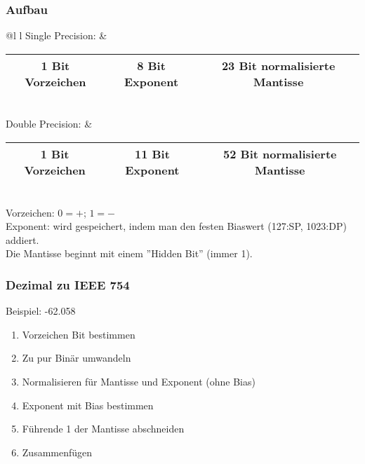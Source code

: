 \documentclass[12pt]{article}
\begin{document}
\subsubsection{Aufbau}
\begin{tabular}{@{}l l}
    Single Precision: &
    \begin{tabular}{|c|c|c|}
        \hline
        1 Bit Vorzeichen & 8 Bit Exponent & 23 Bit normalisierte Mantisse\\
        \hline
    \end{tabular} \\
    Double Precision: &
    \begin{tabular}{|c|c|c|}
        \hline
        1 Bit Vorzeichen & 11 Bit Exponent & 52 Bit normalisierte Mantisse\\
        \hline
    \end{tabular}
\end{tabular} \\
\newline
Vorzeichen: $0 = +$; $1 = -$ \\
\newline
Exponent: wird gespeichert, indem man den festen Biaswert (127:SP, 1023:DP) addiert. \\
\newline
Die Mantisse beginnt mit einem ''Hidden Bit'' (immer 1).
\subsubsection{Dezimal zu IEEE 754}
Beispiel: -62.058
\begin{enumerate}
    \item Vorzeichen Bit bestimmen
    \item Zu pur Binär umwandeln
    \item Normalisieren für Mantisse und Exponent (ohne Bias)
    \item Exponent mit Bias bestimmen
    \item Führende 1 der Mantisse abschneiden
    \item Zusammenfügen
\end{enumerate}
\end{document}
